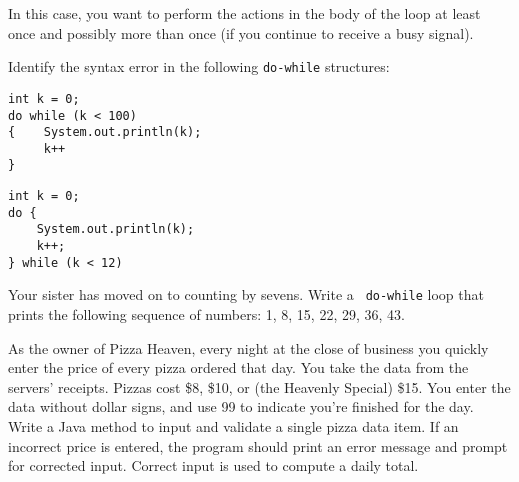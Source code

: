 \noindent In this case, you want to perform the actions in
the body of the loop at least once and possibly more than
once (if you continue to receive a busy signal).




\label{self-study-exercises}
\begin{SSTUDY}
\item Identify the syntax error in the
following {\tt do-while} \mbox{structures:}
\begin{EXRLL}
\item

\begin{jjjlisting}
\begin{lstlisting}
int k = 0;
do while (k < 100)
{    System.out.println(k);
     k++
}
\end{lstlisting}
\end{jjjlisting}

\item

\begin{jjjlisting}
\begin{lstlisting}
int k = 0;
do {
    System.out.println(k);
    k++;
} while (k < 12)
\end{lstlisting}
\end{jjjlisting}
\end{EXRLL}


\item Your sister has moved on to counting by sevens. Write a {\tt
do-while} loop that prints the following sequence of numbers: 1, 8,
15, 22, 29, 36, 43.


\item  As the owner of Pizza Heaven, every night at the close of business you
quickly enter the price of every pizza ordered that day. You take the
data from the servers' receipts. Pizzas cost \$8, \$10, or (the
Heavenly Special) \$15. You enter the data without dollar signs, and
use 99 to indicate you're finished for the day.  Write a Java method to
input and validate a single pizza data item. If an incorrect price is
entered, the program should print an error message and prompt for
corrected input.  Correct input is used to compute a daily total.


\end{SSTUDY}
